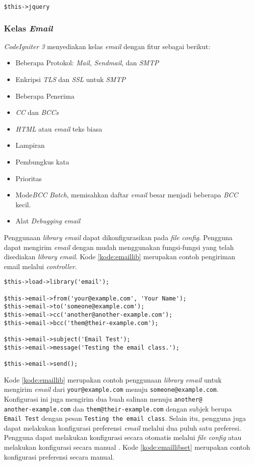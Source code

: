 \begin{center}
\verb|$this->jquery|
\end{center}

\subsubsection{Kelas \textit{Email}}
\textit{CodeIgniter 3} menyediakan kelas \textit{email} dengan fitur sebagai berikut:

\begin{itemize}
\item Beberapa Protokol: \textit{Mail, Sendmail}, dan \textit{SMTP}
\item Enkripsi \textit{TLS} dan \textit{SSL} untuk \textit{SMTP}
\item Beberapa Penerima
\item \textit{CC} dan \textit{BCCs}
\item \textit{HTML} atau \textit{email} teks biasa
\item Lampiran
\item Pembungkus kata
\item Prioritas
\item Mode\textit{BCC Batch}, memisahkan daftar \textit{email} besar menjadi beberapa \textit{BCC} kecil.
\item Alat \textit{Debugging email}
\end{itemize}

Penggunaan \textit{library email} dapat dikonfigurasikan pada \textit{file config}. Pengguna dapat mengirim \textit{email} dengan mudah menggunakan fungsi-fungsi yang telah disediakan \textit{library email}. Kode \ref{kode:emaillib} merupakan contoh pengiriman email melalui \textit{controller}.

\begin{lstlisting}[caption=Contoh pengiriman email melalui \textit{controller}, label=kode:emaillib]
$this->load->library('email');

$this->email->from('your@example.com', 'Your Name');
$this->email->to('someone@example.com');
$this->email->cc('another@another-example.com');
$this->email->bcc('them@their-example.com');

$this->email->subject('Email Test');
$this->email->message('Testing the email class.');

$this->email->send();
\end{lstlisting}

Kode \ref{kode:emaillib} merupakan contoh penggunaan \textit{library email} untuk mengirim \textit{email} dari \texttt{your@example.com} menuju \texttt{someone@example.com}. Konfigurasi ini juga mengirim dua buah salinan menuju \texttt{another@\\another-example.com} dan \texttt{them@their-example.com} dengan subjek berupa \texttt{Email Test} dengan pesan \texttt{Testing the email class}. Selain itu, pengguna juga dapat melakukan konfigurasi preferensi \textit{email} melalui dua puluh satu preferesi. Pengguna dapat melakukan konfigurasi secara otomatis melalui \textit{file config} atau melakukan konfigurasi secara manual . Kode \ref{kode:emaillibset} merupakan contoh konfigurasi preferensi secara manual.

